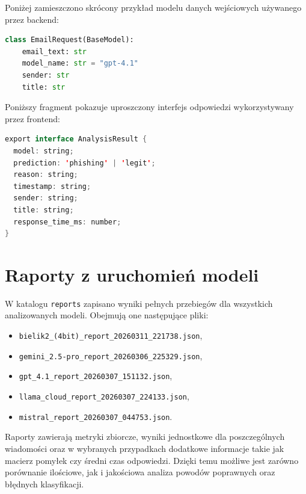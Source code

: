\documentclass[12pt,a4paper,openany]{report}
\begin{document}
Poniżej zamieszczono skrócony przykład modelu danych wejściowych używanego przez backend:

\begin{lstlisting}[language=Python,caption={Przykładowa struktura żądania wejściowego w backendzie}]
class EmailRequest(BaseModel):
    email_text: str
    model_name: str = "gpt-4.1"
    sender: str
    title: str
\end{lstlisting}

Poniższy fragment pokazuje uproszczony interfejs odpowiedzi wykorzystywany przez frontend:

\begin{lstlisting}[language=Java,caption={Przykładowa struktura wyniku analizy w warstwie frontendowej}]
export interface AnalysisResult {
  model: string;
  prediction: 'phishing' | 'legit';
  reason: string;
  timestamp: string;
  sender: string;
  title: string;
  response_time_ms: number;
}
\end{lstlisting}

\section{Raporty z uruchomień modeli}

W katalogu \texttt{reports} zapisano wyniki pełnych przebiegów dla wszystkich analizowanych modeli. Obejmują one następujące pliki:

\begin{itemize}
    \item \texttt{bielik2\_(4bit)\_report\_20260311\_221738.json},
    \item \texttt{gemini\_2.5-pro\_report\_20260306\_225329.json},
    \item \texttt{gpt\_4.1\_report\_20260307\_151132.json},
    \item \texttt{llama\_cloud\_report\_20260307\_224133.json},
    \item \texttt{mistral\_report\_20260307\_044753.json}.
\end{itemize}

Raporty zawierają metryki zbiorcze, wyniki jednostkowe dla poszczególnych wiadomości oraz w wybranych przypadkach dodatkowe informacje takie jak macierz pomyłek czy średni czas odpowiedzi. Dzięki temu możliwe jest zarówno porównanie ilościowe, jak i jakościowa analiza powodów poprawnych oraz błędnych klasyfikacji.
\end{document}
